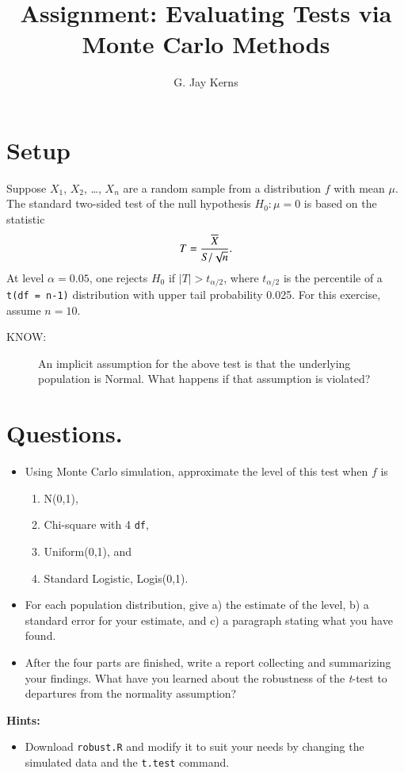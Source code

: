 \documentclass[11pt,english]{article}
\title{Assignment: Evaluating Tests via Monte Carlo Methods}
\author{G. Jay Kerns}
\date{}
\begin{document}
\maketitle


\section*{Setup}
\label{sec-1}


Suppose $X_{1}$, $X_{2}$, \ldots{}, $X_{n}$ are a random sample from a distribution $f$ with mean $\mu$.  The standard two-sided test of the null hypothesis $H_{0}: \mu = 0$ is based on the statistic
\[
T = \frac{\overline{X}}{S/\sqrt{n}}.
\]
At level $\alpha = 0.05$, one rejects $H_{0}$ if $|T| > t_{\alpha/2}$, where $t_{\alpha/2}$ is the percentile of a \texttt{t(df = n-1)} distribution with upper tail probability 0.025.  For this exercise, assume $n = 10$.


\begin{description}
\item[KNOW:] An implicit assumption for the above test is that the underlying population is Normal. What happens if that assumption is violated?
\end{description}
\section*{Questions.}
\label{sec-2}


\begin{itemize}
\item Using Monte Carlo simulation, approximate the level of this test when $f$ is
\begin{enumerate}
\item N(0,1),
\item Chi-square with 4 \texttt{df},
\item Uniform(0,1), and
\item Standard Logistic, Logis(0,1).
\end{enumerate}
\item For each population distribution, give a) the estimate of the level, b) a standard error for your estimate, and c) a paragraph stating what you have found.
\item After the four parts are finished, write a report collecting and summarizing your findings.  What have you learned about the robustness of the \emph{t}-test to departures from the normality assumption?
\end{itemize}

\textbf{Hints:}

\begin{itemize}
\item Download \texttt{robust.R} and modify it to suit your needs by changing the simulated data and the \texttt{t.test} command.
\end{itemize}
\end{document}
